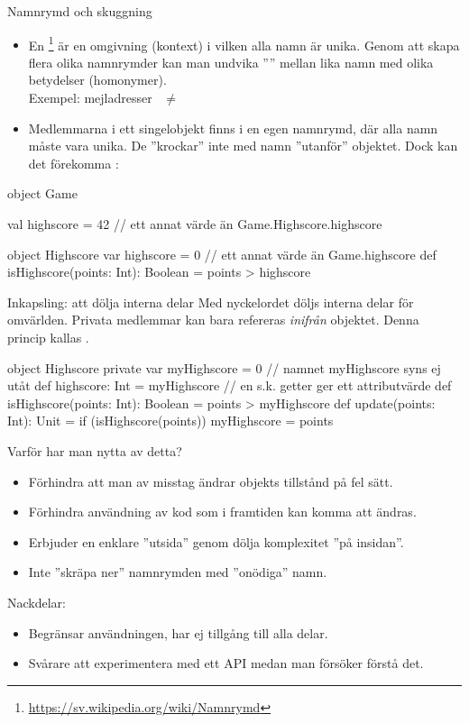 \begin{Slide}{Namnrymd och skuggning}
\begin{itemize}\SlideFontSmall
  \item En \footnote{\url{https://sv.wikipedia.org/wiki/Namnrymd}}   är en omgivning (kontext) i vilken alla namn är unika. Genom att skapa flera olika namnrymder
  kan man undvika '''' mellan lika namn med olika betydelser (homonymer). \\
  Exempel: mejladresser   ~$\neq$~  
  \item Medlemmarna i ett singelobjekt finns i en egen namnrymd,
  där alla namn måste vara unika. De ''krockar'' inte med namn ''utanför'' objektet. Dock kan det förekomma  :
\end{itemize}
\begin{Code}
object Game {

  val highscore = 42   // ett annat värde än Game.Highscore.highscore

  object Highscore {
    var highscore = 0  // ett annat värde än Game.highscore
    def isHighscore(points: Int): Boolean = points > highscore
  }
}
\end{Code}

\end{Slide}



\begin{Slide}{Inkapsling: att dölja interna delar}\SlideFontSmall
Med nyckelordet  döljs interna delar för omvärlden.
Privata medlemmar kan bara refereras \emph{inifrån} objektet.
Denna princip kallas  .
\begin{CodeSmall}
object Highscore {
  private var myHighscore = 0        // namnet myHighscore syns ej utåt
  def highscore: Int = myHighscore   // en s.k. getter ger ett attributvärde
  def isHighscore(points: Int): Boolean = points > myHighscore
  def update(points: Int): Unit = if (isHighscore(points)) myHighscore = points
}
\end{CodeSmall}
\pause
Varför har man nytta av detta?
\begin{itemize}
  \item Förhindra att man av misstag ändrar objekts tillstånd på fel sätt.
  \item Förhindra användning av kod som i framtiden kan komma att ändras.
  \item Erbjuder en enklare ''utsida'' genom dölja komplexitet ''på insidan''.
  \item Inte ''skräpa ner'' namnrymden med ''onödiga'' namn.
\end{itemize}
Nackdelar:
\begin{itemize}
  \item Begränsar användningen, har ej tillgång till alla delar.
  \item Svårare att experimentera med ett API medan man försöker förstå det.
\end{itemize}
\end{Slide}




